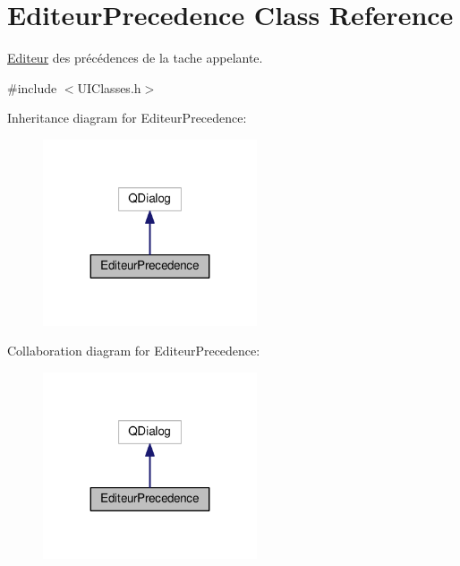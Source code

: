\hypertarget{class_editeur_precedence}{}\section{Editeur\+Precedence Class Reference}
\label{class_editeur_precedence}


\hyperlink{class_editeur}{Editeur} des précédences de la tache appelante.  




{\ttfamily \#include $<$U\+I\+Classes.\+h$>$}



Inheritance diagram for Editeur\+Precedence\+:\nopagebreak
\begin{figure}[H]
\begin{center}
\leavevmode
\includegraphics[width=179pt]{class_editeur_precedence__inherit__graph}
\end{center}
\end{figure}


Collaboration diagram for Editeur\+Precedence\+:\nopagebreak
\begin{figure}[H]
\begin{center}
\leavevmode
\includegraphics[width=179pt]{class_editeur_precedence__coll__graph}
\end{center}
\end{figure}
